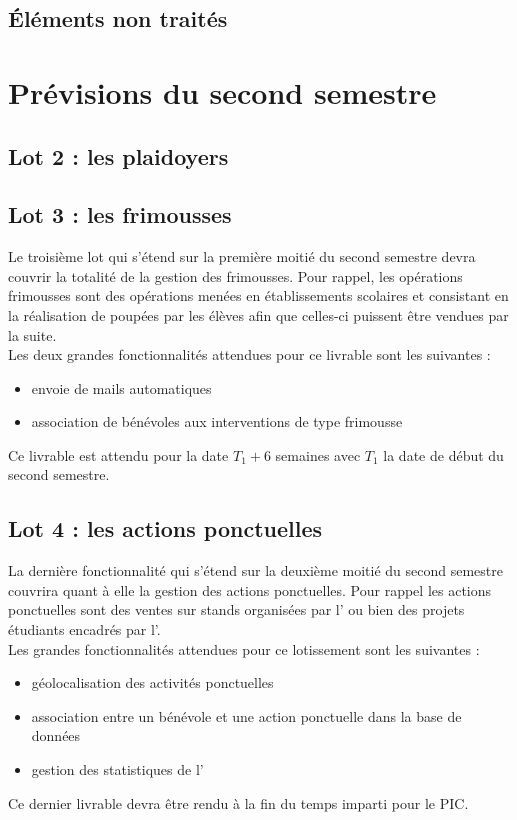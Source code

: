 \documentclass[asi]{picInsa}
\begin{document}
\subsection{Éléments non traités}



\section{Prévisions du second semestre}
\subsection{Lot 2 : les plaidoyers}


\subsection{Lot 3 : les frimousses}
Le troisième lot qui s'étend sur la première moitié du second semestre devra couvrir la totalité de la gestion des frimousses. Pour rappel, les opérations frimousses sont des opérations menées en établissements scolaires et consistant en la réalisation de poupées par les élèves afin que celles-ci puissent être vendues par la suite.\\
Les deux grandes fonctionnalités attendues pour ce livrable sont les suivantes :
\begin{itemize}
	\item envoie de mails automatiques
	\item association de bénévoles aux interventions de type frimousse\vspace{0.5cm}
\end{itemize}

Ce livrable est attendu pour la date $T_{1}+6$ semaines avec $T_{1}$ la date de début du second semestre.

\subsection{Lot 4 : les actions ponctuelles}
La dernière fonctionnalité qui s'étend sur la deuxième moitié du second semestre couvrira quant à elle la gestion des actions ponctuelles. Pour rappel les actions ponctuelles sont des ventes sur stands organisées par l'\nomClient{} ou bien des projets étudiants encadrés par l'\nomClient{}.\\
Les grandes fonctionnalités attendues pour ce lotissement sont les suivantes : 
\begin{itemize}
	\item géolocalisation des activités ponctuelles
	\item association entre un bénévole et une action ponctuelle dans la base de données
	\item gestion des statistiques de l'\nomClient{}\vspace{0.5cm}
\end{itemize}
Ce dernier livrable devra être rendu à la fin du temps imparti pour le PIC.
\end{document}
